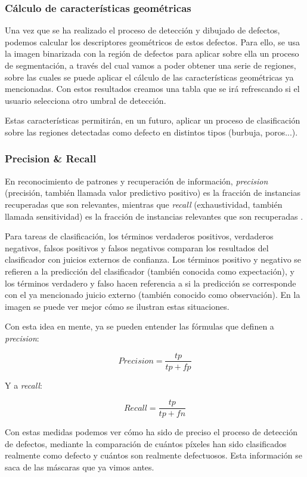 \subsubsection{Cálculo de características geométricas}
Una vez que se ha realizado el proceso de detección y dibujado de defectos, podemos calcular los descriptores geométricos de estos defectos. Para ello, se usa la imagen binarizada con la región de defectos para aplicar sobre ella un proceso de segmentación, a través del cual vamos a poder obtener una serie de regiones, sobre las cuales se puede aplicar el cálculo de las características geométricas ya mencionadas. Con estos resultados creamos una tabla que se irá refrescando si el usuario selecciona otro umbral de detección.

Estas características permitirán, en un futuro, aplicar un proceso de clasificación sobre las regiones detectadas como defecto en distintos tipos (burbuja, poros...).

\subsubsection{Precision \& Recall}
En reconocimiento de patrones y recuperación de información, \textit{precision} (precisión, también llamada valor predictivo positivo) es la fracción de instancias recuperadas que son relevantes, mientras que \textit{recall} (exhaustividad, también llamada sensitividad) es la fracción de instancias relevantes que son recuperadas \cite{wiki:precisionandrecall}.

Para tareas de clasificación, los términos verdaderos positivos, verdaderos negativos, falsos positivos y falsos negativos comparan los resultados del clasificador con juicios externos de confianza. Los términos positivo y negativo se refieren a la predicción del clasificador (también conocida como expectación), y los términos verdadero y falso hacen referencia a si la predicción se corresponde con el ya mencionado juicio externo (también conocido como observación). En la imagen  se puede ver mejor cómo se ilustran estas situaciones.


Con esta idea en mente, ya se pueden entender las fórmulas que definen a \textit{precision}:

\[Precision=\frac{tp}{tp+fp}\]

Y a \textit{recall}:

\[Recall=\frac{tp}{tp+fn}\]

Con estas medidas podemos ver cómo ha sido de preciso el proceso de detección de defectos, mediante la comparación de cuántos píxeles han sido clasificados realmente como defecto y cuántos son realmente defectuosos. Esta información se saca de las máscaras que ya vimos antes.